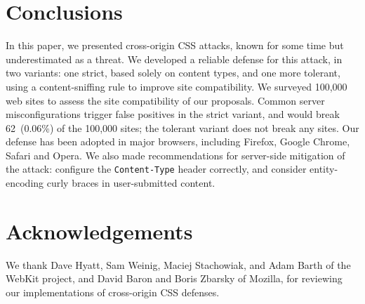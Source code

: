 \documentclass{acm_proc_article-sp}
\begin{document}
\section{Conclusions} \label{sec:conclusion}
In this paper, we presented cross-origin CSS attacks, known for some
time but underestimated as a threat.  We developed a reliable defense
for this attack, in two variants: one strict, based solely on content
types, and one more tolerant, using a content-sniffing rule to improve
site compatibility.  We surveyed 100,000 web sites to assess the site
compatibility of our proposals.  Common server misconfigurations
trigger false positives in the strict variant, and would break
62~(0.06\%) of the 100,000 sites; the tolerant variant does not break
any sites.  Our defense has been adopted in major browsers, including
Firefox, Google Chrome, Safari and Opera.  We also made
recommendations for server-side mitigation of the attack: configure
the \texttt{Content-Type} header correctly, and consider
entity-encoding curly braces in user-submitted content.

\section*{Acknowledgements}

We thank Dave Hyatt, Sam Weinig, Maciej Stachowiak, and Adam Barth of
the WebKit project, and David Baron and Boris Zbarsky of Mozilla, for
reviewing our implementations of cross-origin CSS defenses.



\end{document}
